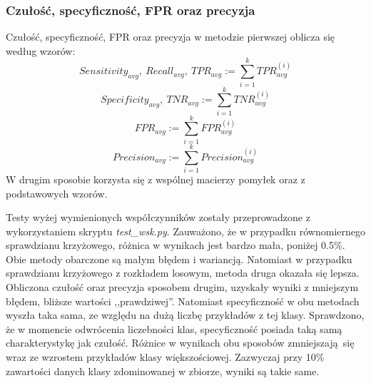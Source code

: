 \subsubsection{Czułość, specyficzność, FPR oraz precyzja}
Czułość, specyficzność, FPR oraz precyzja w metodzie pierwszej oblicza się według wzorów:
\[Sensitivity_{avg},\ Recall_{avg},\ TPR_{avg} := \sum_{i=1}^{k} TPR_{avg}^{(i)}\]
\[Specificity_{avg},\ TNR_{avg} := \sum_{i=1}^{k} TNR_{avg}^{(i)}\]
\[FPR_{avg} := \sum_{i=1}^{k} FPR_{avg}^{(i)}\]
\[Precision_{avg} := \sum_{i=1}^{k} Precision_{avg}^{(i)}\]
W drugim sposobie korzysta się z wspólnej macierzy pomyłek oraz z podstawowych wzorów. \par
Testy wyżej wymienionych współczynników zostały przeprowadzone z wykorzystaniem skryptu \textit{test\_wsk.py}. Zauważono, że w przypadku równomiernego sprawdzianu krzyżowego, różnica w wynikach jest bardzo mała, poniżej 0.5\%. Obie metody obarczone są małym błędem i wariancją. Natomiast w przypadku sprawdzianu krzyżowego z rozkładem losowym, metoda druga okazała się lepsza. Obliczona czułość oraz precyzja sposobem drugim, uzyskały wyniki z mniejszym błędem, bliższe wartości ,,prawdziwej''. Natomiast specyficzność w obu metodach wyszła taka sama, ze względu na dużą liczbę przykładów z tej klasy. Sprawdzono, że w momencie odwrócenia liczebności klas, specyficzność posiada taką samą charakterystykę jak czułość. Różnice w wynikach obu sposobów zmniejszają się wraz ze wzrostem przykładów klasy większościowej. Zazwyczaj przy 10\% zawartości danych klasy zdominowanej w zbiorze, wyniki są takie same.
